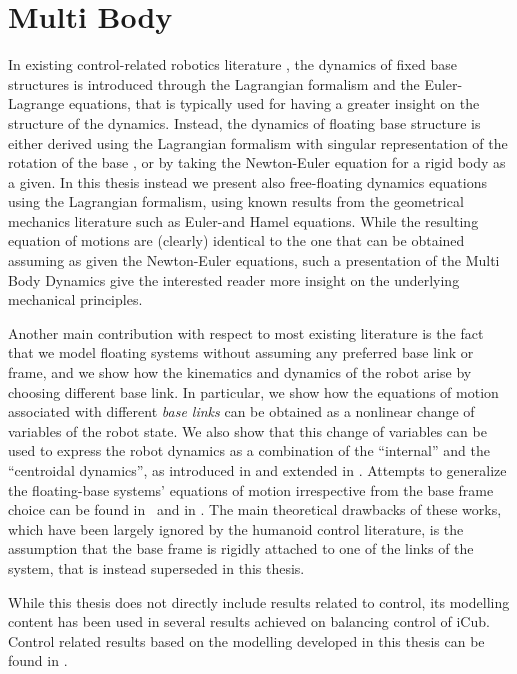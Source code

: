 \chapter{Multi Body}
\label{chap:multibody}

In existing control-related robotics literature \citep{siciliano2010robotics}, the dynamics of fixed base structures is introduced through the Lagrangian formalism and the Euler-Lagrange equations, that is typically used for having a greater insight on the structure of the dynamics. Instead, the dynamics of floating base structure is either derived using the Lagrangian formalism with singular representation of the rotation of the base \citep{wieber2015handbook}, or by taking the Newton-Euler equation for a rigid body as a given\citep{featherstone2008,jain2010}. In this thesis instead we present also free-floating dynamics equations using the Lagrangian formalism, using known results from the geometrical mechanics literature \citep{marsden2013introduction} such as Euler-\Poincare and Hamel equations. While the resulting equation of motions are (clearly) identical to the one that can be obtained assuming as given the Newton-Euler equations, such a presentation of the Multi Body Dynamics give the interested reader more insight on the underlying mechanical principles.

Another main contribution with respect to most existing literature is the fact that we model floating systems without assuming any preferred base link or frame, and we show how the kinematics and dynamics of the robot arise by choosing  different base link. In particular, we show how the equations of motion associated with  different \emph{base links} can be obtained as a nonlinear change of variables of the robot state. We also show that this  change of variables can be  used to express the robot dynamics as a combination of the ``internal'' and the ``centroidal dynamics'', as introduced in \citep{Orin2013} and extended in \citep{garofalo2015inertially}. Attempts to generalize the floating-base systems' equations of motion irrespective from the  base frame choice can be found in~\citep[Chapter 3]{oort2011} and in \citep[Chapter 17, Section 3.6]{jain2010}. The main theoretical drawbacks of these works, which have been largely ignored by the humanoid control literature, is the assumption that the base frame is rigidly attached to one of the links of the system, that is instead superseded in this thesis.

While this thesis does not directly include results related to control, its modelling content has been used in several results achieved on balancing control of iCub.  Control related results based on the modelling developed in this thesis can be found in \citep{nava2016,pucci2016gain,dafarra2016}.

